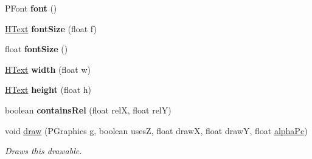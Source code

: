 \begin{DoxyCompactItemize}
\item 
\hypertarget{classhype_1_1extended_1_1drawable_1_1_h_text_ab8cb9c7ccd23080ffb61c04eef69736b}{P\-Font {\bfseries font} ()}\label{classhype_1_1extended_1_1drawable_1_1_h_text_ab8cb9c7ccd23080ffb61c04eef69736b}

\item 
\hypertarget{classhype_1_1extended_1_1drawable_1_1_h_text_addd6db9160f2a16a48ec2c98d7df909c}{\hyperlink{classhype_1_1extended_1_1drawable_1_1_h_text}{H\-Text} {\bfseries font\-Size} (float f)}\label{classhype_1_1extended_1_1drawable_1_1_h_text_addd6db9160f2a16a48ec2c98d7df909c}

\item 
\hypertarget{classhype_1_1extended_1_1drawable_1_1_h_text_a0724526739ec54a7634bb575ce2345d2}{float {\bfseries font\-Size} ()}\label{classhype_1_1extended_1_1drawable_1_1_h_text_a0724526739ec54a7634bb575ce2345d2}

\item 
\hypertarget{classhype_1_1extended_1_1drawable_1_1_h_text_a7013b6d524715ca3655adc3ff14ecc31}{\hyperlink{classhype_1_1extended_1_1drawable_1_1_h_text}{H\-Text} {\bfseries width} (float w)}\label{classhype_1_1extended_1_1drawable_1_1_h_text_a7013b6d524715ca3655adc3ff14ecc31}

\item 
\hypertarget{classhype_1_1extended_1_1drawable_1_1_h_text_a3746dbc04cb348b235ab70d653e1d41d}{\hyperlink{classhype_1_1extended_1_1drawable_1_1_h_text}{H\-Text} {\bfseries height} (float h)}\label{classhype_1_1extended_1_1drawable_1_1_h_text_a3746dbc04cb348b235ab70d653e1d41d}

\item 
\hypertarget{classhype_1_1extended_1_1drawable_1_1_h_text_a302d7a125313b353a536817dcc906e88}{boolean {\bfseries contains\-Rel} (float rel\-X, float rel\-Y)}\label{classhype_1_1extended_1_1drawable_1_1_h_text_a302d7a125313b353a536817dcc906e88}

\item 
void \hyperlink{classhype_1_1extended_1_1drawable_1_1_h_text_acff0face36490c9482ad0c536a9612d3}{draw} (P\-Graphics g, boolean uses\-Z, float draw\-X, float draw\-Y, float \hyperlink{classhype_1_1core_1_1drawable_1_1_h_drawable_ab71ad420ba6d4a5eb981296684033d74}{alpha\-Pc})
\begin{DoxyCompactList}\small\item\em Draws this drawable. \end{DoxyCompactList}\end{DoxyCompactItemize}
